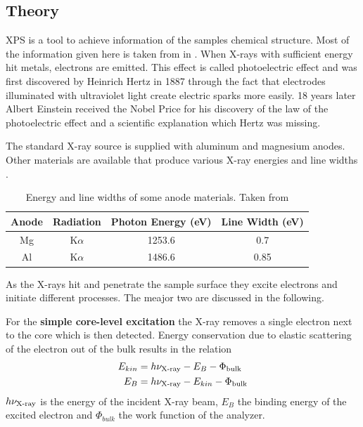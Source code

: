 \subsection{Theory}
\label{section:XPS} XPS is a tool to achieve information of the samples chemical structure.
Most of the information given here is taken from \cite{Riviere_90} in \cite{briggs_auger_1990}.
When X-rays with sufficient energy hit metals, electrons are emitted. This effect is called photoelectric effect and was first discovered by Heinrich Hertz in 1887 through the fact that electrodes illuminated with ultraviolet light create electric sparks more easily\cite{hertz_ueber_1887}. 18 years later Albert Einstein received the Nobel Price for his discovery of the law of the photoelectric effect\cite{_nobel_2015} and a scientific explanation which Hertz was missing.

The standard X-ray source is supplied with aluminum and magnesium anodes. Other materials are available that produce various X-ray energies and line widths  \cite{_x-ray_2015}. 
\begin{table}\caption{Energy and line widths of some anode materials. Taken from \cite{_x-ray_2015}}
	\centering
	\begin{tabular}{cccc}
		Anode 	& 	Radiation 	& Photon Energy (eV) 	& Line Width (eV) \\ \hline
		Mg	&	K$\alpha$ 	&	1253.6	&	0.7\\
		Al	&	K$\alpha$ 	&	1486.6 	&	0.85\\
	\end{tabular}
\end{table}

As the X-rays hit and penetrate the sample surface they excite electrons and initiate different processes. The meajor two are discussed in the following.

For the \textbf{simple core-level excitation} the X-ray removes a single electron next to the core which is then detected. Energy conservation due to elastic scattering of the electron out of the bulk results in the relation 
\begin{align}
E_{kin} &= h\nu_{\textnormal{X-ray}}-E_{B}-\Phi_{\textnormal{bulk}} \\
E_B 	&=h\nu_{\textnormal{X-ray}}-E_{kin}-\Phi_{\textnormal{bulk}}
\end{align}
 $h\nu_{\textnormal{X-ray}}$ is the energy of the incident X-ray beam, $E_B$ the binding energy of the excited electron and $\Phi_{bulk}$ the work function of the analyzer. 
 
